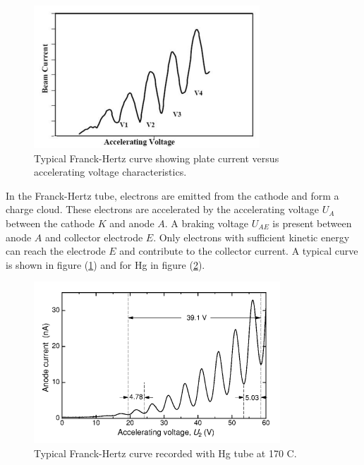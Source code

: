 \documentclass[%
 reprint,
 amsmath,amssymb,
 aps,
]{revtex4-2}
\begin{document}
    \begin{figure}
        \centering
        \includegraphics{Figures/typicalcurve.png}
        \caption{Typical Franck-Hertz curve showing plate current versus accelerating voltage characteristics.}
        \label{fig:typical1}
    \end{figure}
    \par
    In the Franck-Hertz tube, electrons are emitted from the cathode and form a charge cloud. These electrons are accelerated by the accelerating voltage $U_A$ between the cathode $K$ and anode $A$. A braking voltage $U_{AE}$ is present between anode $A$ and collector electrode $E$. Only electrons with sufficient kinetic energy can reach the electrode $E$ and contribute to the collector current. A typical curve is shown in figure (\ref{fig:typical1}) and for Hg in figure (\ref{fig:typicalHg}).
    \begin{figure}
        \centering
        \includegraphics[scale = 0.9]{Figures/typicalhg.png}
        \caption{Typical Franck-Hertz curve recorded with Hg tube at 170 \degree C.}
        \label{fig:typicalHg}
    \end{figure}
    \par
\end{document}
